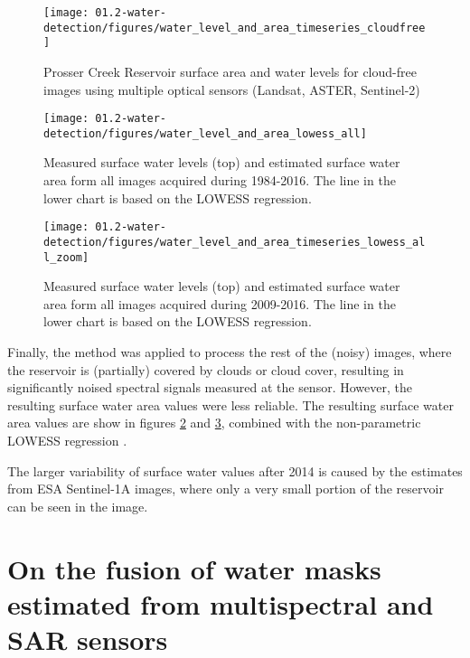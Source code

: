 \begin{figure}[H]
	\centering
	\texttt{[image: 01.2-water-detection/figures/water\_level\_and\_area\_timeseries\_cloudfree]}
	\caption{Prosser Creek Reservoir surface area and water levels for cloud-free images using multiple optical sensors (Landsat, ASTER, Sentinel-2)}
	\label{fig:water_level_and_area_timeseries_cloudfree}
\end{figure}

\begin{figure}[H]
	\centering
	\texttt{[image: 01.2-water-detection/figures/water\_level\_and\_area\_lowess\_all]}
	\caption{Measured surface water levels (top) and estimated surface water area form all images acquired during 1984-2016. The line in the lower chart is based on the LOWESS regression.}
	\label{fig:water_level_and_area_timeseries_lowess_all}
\end{figure}

\begin{figure}[H]
	\centering
	\texttt{[image: 01.2-water-detection/figures/water\_level\_and\_area\_timeseries\_lowess\_all\_zoom]}
	\caption{Measured surface water levels (top) and estimated surface water area form all images acquired during 2009-2016. The line in the lower chart is based on the LOWESS regression.}
	\label{fig:water_level_and_area_timeseries_lowess_all_zoom}
\end{figure}

Finally, the method was applied to process the rest of the (noisy) images, where the reservoir is (partially) covered by clouds or cloud cover, resulting in significantly noised spectral signals measured at the sensor. However, the resulting surface water area values were less reliable. The resulting surface water area values are show in figures \ref{fig:water_level_and_area_timeseries_lowess_all} and \ref{fig:water_level_and_area_timeseries_lowess_all_zoom}, combined with the non-parametric LOWESS regression \citet{cleveland1979robust}. 

The larger variability of surface water values after 2014 is caused by the estimates from ESA Sentinel-1A images, where only a very small portion of the reservoir can be seen in the image.

\section{On the fusion of water masks estimated from multispectral and SAR sensors}

